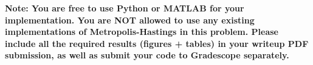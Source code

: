 \documentclass[10pt]{article}
\begin{document}
\textbf{Note: You are free to use Python or MATLAB for your implementation. You are NOT allowed to use any existing implementations of Metropolis-Hastings in this problem. Please include all the required results (figures + tables) in your writeup PDF submission, as well as submit your code to Gradescope separately.}

\clearpage


\end{document}
